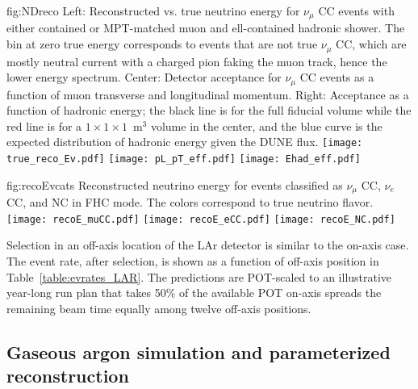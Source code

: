 \begin{dunefigure}[ND reconstruction]{fig:NDreco}
{Left: Reconstructed vs. true neutrino energy for $\nu_{\mu}$ CC events with either contained or MPT-matched muon and ell-contained hadronic shower. The bin at zero true energy corresponds to events that are not true $\nu_{\mu}$ CC, which are mostly neutral current with a charged pion faking the muon track, hence the lower energy spectrum. Center: Detector acceptance for $\nu_{\mu}$ CC events as a function of muon transverse and longitudinal momentum. Right: Acceptance as a function of hadronic energy; the black line is for the full fiducial volume while the red line is for a $1 \times 1 \times 1$~m$^{3}$ volume in the center, and the blue curve is the expected distribution of hadronic energy given the DUNE flux.}
 \texttt{[image: true\_reco\_Ev.pdf]}
 \texttt{[image: pL\_pT\_eff.pdf]}
 \texttt{[image: Ehad\_eff.pdf]}
\end{dunefigure}

\begin{dunefigure}{fig:recoEvcats}
{Reconstructed neutrino energy for events classified as $\nu_{\mu}$ CC, $\nu_{e}$ CC, and NC in FHC mode. The colors correspond to true neutrino flavor.}
 \texttt{[image: recoE\_muCC.pdf]}
 \texttt{[image: recoE\_eCC.pdf]}
 \texttt{[image: recoE\_NC.pdf]}
\end{dunefigure}

Selection in an off-axis location of the LAr detector is similar to the on-axis case. The event rate, after selection, is shown as a function of off-axis position in Table~\ref{table:evrates_LAR}.  The predictions are POT-scaled to an illustrative year-long run plan that takes 50\% of the available POT on-axis spreads the remaining beam time equally among  twelve off-axis positions.  

\subsection{Gaseous argon simulation and parameterized reconstruction}
\label{sec:garndsimreco}




